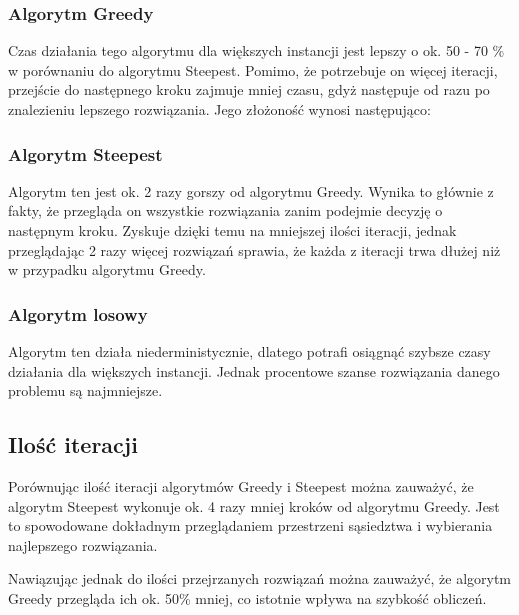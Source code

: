 \subsubsection{Algorytm Greedy}

Czas działania tego algorytmu dla większych instancji jest lepszy o ok. 50 - 70 \% w porównaniu 
do algorytmu Steepest. Pomimo, że potrzebuje on więcej iteracji, przejście do następnego kroku 
zajmuje mniej czasu, gdyż następuje od razu po znalezieniu lepszego rozwiązania. Jego złożoność 
wynosi następująco:

\subsubsection{Algorytm Steepest}

Algorytm ten jest ok. 2 razy gorszy od algorytmu Greedy. Wynika to głównie z fakty, że przegląda on
wszystkie rozwiązania zanim podejmie decyzję o następnym kroku. Zyskuje dzięki temu na mniejszej
ilości iteracji, jednak przeglądając 2 razy więcej rozwiązań sprawia, że każda z iteracji trwa 
dłużej niż w przypadku algorytmu Greedy.

\subsubsection{Algorytm losowy}

Algorytm ten działa niederministycznie, dlatego potrafi osiągnąć szybsze czasy działania dla 
większych instancji. Jednak procentowe szanse rozwiązania danego problemu są najmniejsze.

\subsection{Ilość iteracji}

Porównując ilość iteracji algorytmów Greedy i Steepest można zauważyć, że algorytm 
Steepest wykonuje ok. 4 razy mniej kroków od algorytmu Greedy. Jest to spowodowane 
dokładnym przeglądaniem przestrzeni sąsiedztwa i wybierania najlepszego rozwiązania.

Nawiązując jednak do ilości przejrzanych rozwiązań można zauważyć, że algorytm
Greedy przegląda ich ok. 50\% mniej, co istotnie wpływa na szybkość obliczeń.
